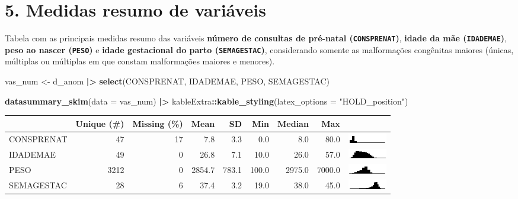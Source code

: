 \documentclass[
]{article}
\newenvironment{Shaded}{\begin{snugshade}}{\end{snugshade}}
\newcommand{\AttributeTok}[1]{\textcolor[rgb]{0.13,0.29,0.53}{#1}}
\newcommand{\FunctionTok}[1]{\textcolor[rgb]{0.13,0.29,0.53}{\textbf{#1}}}
\newcommand{\NormalTok}[1]{#1}
\newcommand{\OtherTok}[1]{\textcolor[rgb]{0.56,0.35,0.01}{#1}}
\newcommand{\SpecialCharTok}[1]{\textcolor[rgb]{0.81,0.36,0.00}{\textbf{#1}}}
\newcommand{\StringTok}[1]{\textcolor[rgb]{0.31,0.60,0.02}{#1}}
\begin{document}
\newpage

\hypertarget{medidas-resumo-de-variuxe1veis}{%
\section{5. Medidas resumo de
variáveis}\label{medidas-resumo-de-variuxe1veis}}

Tabela com as principais medidas resumo das variáveis \textbf{número de
consultas de pré-natal (\texttt{CONSPRENAT})}, \textbf{idade da mãe
(\texttt{IDADEMAE})}, \textbf{peso ao nascer (\texttt{PESO})} e
\textbf{idade gestacional do parto (\texttt{SEMAGESTAC})}, considerando
somente as malformações congênitas maiores (únicas, múltiplas ou
múltiplas em que constam malformações maiores e menores).

\begin{Shaded}
\begin{Highlighting}[]
\NormalTok{vas\_num }\OtherTok{\textless{}{-}}\NormalTok{ d\_anom }\SpecialCharTok{|\textgreater{}}  
  \FunctionTok{select}\NormalTok{(CONSPRENAT, IDADEMAE, PESO, SEMAGESTAC)}

\FunctionTok{datasummary\_skim}\NormalTok{(}\AttributeTok{data =}\NormalTok{ vas\_num) }\SpecialCharTok{|\textgreater{}} 
\NormalTok{  kableExtra}\SpecialCharTok{::}\FunctionTok{kable\_styling}\NormalTok{(}\AttributeTok{latex\_options =} \StringTok{"HOLD\_position"}\NormalTok{)}
\end{Highlighting}
\end{Shaded}

\begin{table}[H]
\centering
\begin{tabular}[t]{lrrrrrrr>{}r}
\toprule
  & Unique (\#) & Missing (\%) & Mean & SD & Min & Median & Max &   \\
\midrule
CONSPRENAT & 47 & 17 & \num{7.8} & \num{3.3} & \num{0.0} & \num{8.0} & \num{80.0} & \includegraphics[width=0.67in, height=0.17in]{anom_files/figure-latex//hist_f09b33a9c7a.pdf}\\
IDADEMAE & 49 & 0 & \num{26.8} & \num{7.1} & \num{10.0} & \num{26.0} & \num{57.0} & \includegraphics[width=0.67in, height=0.17in]{anom_files/figure-latex//hist_f09b4009ade3.pdf}\\
PESO & 3212 & 0 & \num{2854.7} & \num{783.1} & \num{100.0} & \num{2975.0} & \num{7000.0} & \includegraphics[width=0.67in, height=0.17in]{anom_files/figure-latex//hist_f09beb0841b.pdf}\\
SEMAGESTAC & 28 & 6 & \num{37.4} & \num{3.2} & \num{19.0} & \num{38.0} & \num{45.0} & \includegraphics[width=0.67in, height=0.17in]{anom_files/figure-latex//hist_f09b729b21ce.pdf}\\
\bottomrule
\end{tabular}
\end{table}
\end{document}
